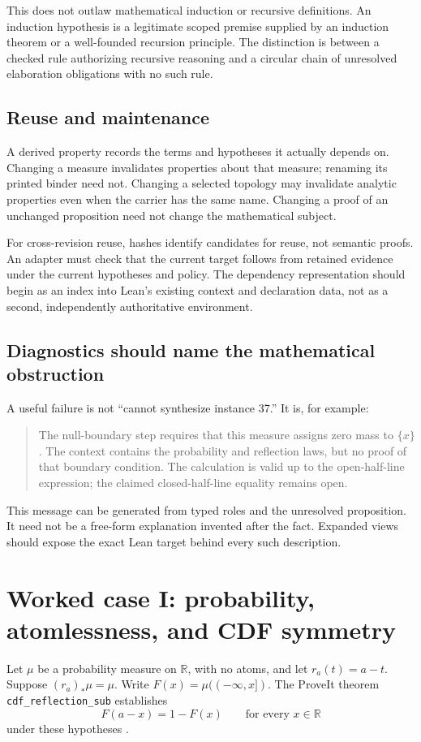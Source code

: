 \documentclass[11pt,a4paper]{article}
\newcommand{\code}[1]{\nolinkurl{#1}}
\newcommand{\R}{\mathbb R}\newcommand{\Q}{\mathbb Q}
\theoremstyle{plain}
\theoremstyle{definition}
\theoremstyle{remark}
\begin{document}
This does not outlaw mathematical induction or recursive definitions.
An induction hypothesis is a legitimate scoped premise supplied by an
induction theorem or a well-founded recursion principle. The distinction is
between a checked rule authorizing recursive reasoning and a circular chain
of unresolved elaboration obligations with no such rule.

\subsection{Reuse and maintenance}
A derived property records the terms and hypotheses it actually depends on.
Changing a measure invalidates properties about that measure; renaming its
printed binder need not. Changing a selected topology may invalidate analytic
properties even when the carrier has the same name. Changing a proof of an
unchanged proposition need not change the mathematical subject.

For cross-revision reuse, hashes identify candidates for reuse, not semantic
proofs. An adapter must check that the current target follows from retained
evidence under the current hypotheses and policy. The dependency representation
should begin as an index into Lean's existing context and declaration data,
not as a second, independently authoritative environment.

\subsection{Diagnostics should name the mathematical obstruction}
A useful failure is not ``cannot synthesize instance 37.'' It is, for example:
\begin{quote}
The null-boundary step requires that this measure assigns zero mass to
$\{x\}$. The context contains the probability and reflection laws, but no
proof of that boundary condition. The calculation is valid up to the
open-half-line expression; the claimed closed-half-line equality remains open.
\end{quote}
This message can be generated from typed roles and the unresolved proposition.
It need not be a free-form explanation invented after the fact. Expanded views
should expose the exact Lean target behind every such description.

\section{Worked case I: probability, atomlessness, and CDF symmetry}
\label{sec:cdf}
Let $\mu$ be a probability measure on $\R$, with no atoms, and let
$r_a(t)=a-t$. Suppose $(r_a)_*\mu=\mu$. Write
$F(x)=\mu(({-}\infty,x])$. The ProveIt theorem
\code{cdf_reflection_sub} establishes
\[
 F(a-x)=1-F(x)
 \qquad\text{for every }x\in\R
\]
under these hypotheses \cite{cdfsource}.
\end{document}
